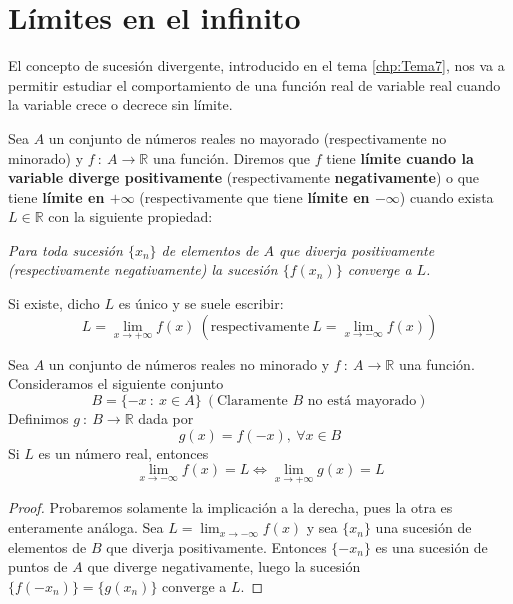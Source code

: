 
\section{Límites en el infinito}

El concepto de sucesión divergente, introducido en el tema \ref{chp:Tema7}, nos va a permitir estudiar el comportamiento de una función real de variable real cuando la variable crece o decrece sin límite.

\begin{definicion}
    Sea $A$ un conjunto de números reales no mayorado (respectivamente no minorado) y $f ~:~ A \longrightarrow \mathbb{R}$ una función. Diremos que $f$ tiene \textbf{límite cuando la variable diverge positivamente} (respectivamente \textbf{negativamente}) o que tiene \textbf{límite en $+\infty$} (respectivamente que tiene \textbf{límite en $-\infty$}) cuando exista $L \in \mathbb{R}$ con la siguiente propiedad:

    \emph{Para toda sucesión $\{x_n\}$ de elementos de $A$ que diverja positivamente (respectivamente negativamente) la sucesión $\{f(x_n)\}$ converge a $L$.}

    Si existe, dicho $L$ es único y se suele escribir:
    \begin{equation*}
        L = \displaystyle\lim_{x \to + \infty} f(x) ~ (\text{respectivamente} ~ L = \displaystyle\lim_{x \to - \infty} f(x))
    \end{equation*}
\end{definicion}

\begin{prop}
    Sea $A$ un conjunto de números reales no minorado y $f ~:~ A \longrightarrow \mathbb{R}$ una función.
    Consideramos el siguiente conjunto
    \begin{equation*}
        B = \{-x ~:~ x \in A\} ~ (\text{Claramente $B$ no está mayorado})
    \end{equation*}
    Definimos $g ~:~ B \longrightarrow \mathbb{R}$ dada por
    \begin{equation*}
        g(x) = f(-x), ~ \forall x \in B
    \end{equation*}
    Si $L$ es un número real, entonces
    \begin{equation*}
        \displaystyle\lim_{x \to - \infty} f(x) = L \Longleftrightarrow \displaystyle\lim_{x \to + \infty} g(x) = L
    \end{equation*}
\end{prop}
\begin{proof}
    Probaremos solamente la implicación a la derecha, pues la otra es enteramente análoga.
    Sea $L = \displaystyle\lim_{x \to - \infty} f(x)$ y sea $\{x_n\}$ una sucesión de elementos de $B$ que diverja positivamente.
    Entonces $\{-x_n\}$ es una sucesión de puntos de $A$ que diverge negativamente, luego la sucesión $\{f(-x_n)\} = \{g(x_n)\}$
    converge a $L$.
\end{proof}

